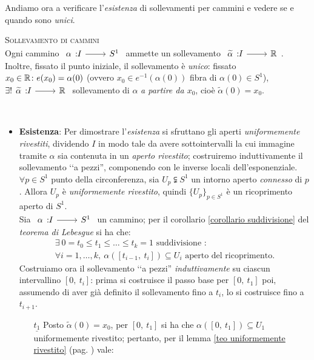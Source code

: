 Andiamo ora a verificare l'\textit{esistenza} di sollevamenti per cammini e vedere se e quando sono \textit{unici}.
\begin{theorema} \textsc{Sollevamento di cammini} \label{teo sollevamento cammini}\\
	Ogni cammino $\funz \alpha I {S^1}$ ammette un sollevamento $\funz {\widetilde{\alpha}} I \realset$. Inoltre, fissato il punto iniziale, il sollevamento è \textit{unico}: fissato $x_0\in\mathbb{R} \colon e(x_0)=\alpha(0)$ (ovvero $x_0\in e^{-1}(\alpha(0))$ fibra di $\alpha(0)\in S^1$),  $\exists ! \funz {\widetilde{\alpha}} I \realset$ sollevamento di $\alpha$ \textit{a partire da $x_0$}, cioè $\widetilde{\alpha}(0)=x_0$.
\end{theorema}
\begin{demonstration}~{}
	\begin{itemize}
		\item \textbf{Esistenza}: Per dimostrare l'\textit{esistenza} si sfruttano gli aperti \textit{uniformemente rivestiti}, dividendo $I$ in modo tale da avere sottointervalli la cui immagine tramite $\alpha$ sia contenuta in un \textit{aperto rivestito}; costruiremo induttivamente il sollevamento ‘‘a pezzi'', componendo con le inverse locali dell'esponenziale.\\
		$\forall p\in S^1$ punto della circonferenza, sia $U_p\subsetneqq S^1$ un intorno aperto \textit{connesso} di $p$. Allora $U_p$ è \textit{uniformemente rivestito}, quindi $\{U_p\}_{p\in S^1}$ è un ricoprimento aperto di $S^1$.\\
		Sia $\funz \alpha I {S^1}$ un cammino; per il corollario \ref{corollario suddivisione} del \textit{teorema di Lebesgue} si ha che:
		\begin{equation*}
			\begin{array}{l}
				\exists\ 0=t_0\leq t_1\leq\dots\leq t_k=1\text{ suddivisione }\colon \\
				\forall i=1,\dots, k,\ \alpha([t_{i-1},\ t_i])\subseteq U_i\text{ aperto del ricoprimento.}
			\end{array}
		\end{equation*}
		Costruiamo ora il sollevamento ‘‘a pezzi'' \textit{induttivamente} su ciascun intervallino $[0,\ t_i]$: prima si costruisce il passo base per $[0,\ t_1]$ poi, assumendo di aver già definito il sollevamento fino a $t_i$, lo si costruisce fino a $t_{i+1}$.\\
		\begin{enumerate}
			\item[$\underline{t_1}$] Posto $\widetilde{\alpha}(0)=x_0$, per $[0,\ t_1]$ si ha che $\alpha\left([0,\ t_1]\right)\subseteq U_1$ uniformemente rivestito; pertanto, per il lemma \ref{teo uniformemente rivestito} (pag. \pageref{teo uniformemente rivestito}) vale:

\end{enumerate}
\end{itemize}
\end{demonstration}

